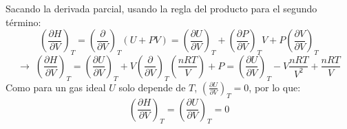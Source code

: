\documentclass[a4paper,12pt]{article}
\begin{document}
\begin{enumerate}
Sacando la derivada parcial, usando la regla del producto para el segundo t\'ermino:
$$\left(\frac{\partial H}{\partial V}\right)_{T}=\left(\frac{\partial }{\partial V}\right)_{T}(U+PV)=\left(\frac{\partial U}{\partial V}\right)_{T}+\left(\frac{\partial P}{\partial V}\right)_{T}V+P\left(\frac{\partial V}{\partial V}\right)_{T}$$
$$\rightarrow\;\left(\frac{\partial H}{\partial V}\right)_{T}=\left(\frac{\partial U}{\partial V}\right)_{T}+V\left(\frac{\partial }{\partial V}\right)_{T}\left(\frac{nRT}{V}\right)+P=\left(\frac{\partial U}{\partial V}\right)_{T}-V\frac{nRT}{V^2}+\frac{nRT}{V}$$
Como para un gas ideal $U$ solo depende de $T$, $\left(\frac{\partial U}{\partial V}\right)_{T}=0$, por lo que:
$$\left(\frac{\partial H}{\partial V}\right)_{T}=\left(\frac{\partial U}{\partial V}\right)_{T}=0$$

\end{enumerate}
\end{document}

